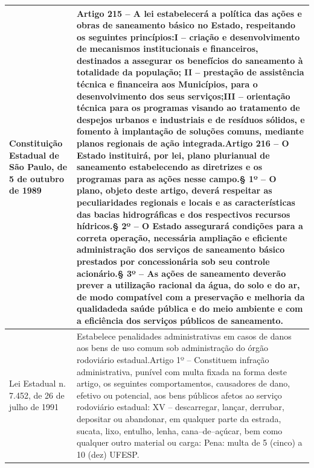 \begin{center}
\begin{longtable}{|p{}|p{}|}
			Constituição  Estadual  de  São Paulo,   de   5   de   outubro   de 1989 & Artigo  215  –  A  lei  estabelecerá  a  política  das  ações  e  obras  de  saneamento básico no Estado, respeitando os seguintes princípios:\newline{}I  –  criação  e  desenvolvimento  de  mecanismos  institucionais  e  financeiros, destinados a assegurar os benefícios do saneamento à totalidade da população; II  –  prestação  de  assistência  técnica  e  financeira  aos  Municípios,  para  o desenvolvimento dos seus serviços;\newline{}III – orientação técnica para os programas visando ao tratamento  de despejos urbanos  e  industriais  e  de  resíduos  sólidos,  e  fomento  à  implantação  de soluções comuns, mediante planos regionais de ação integrada.\newline{}Artigo  216  –  O  Estado  instituirá,  por  lei,  plano  plurianual  de  saneamento estabelecendo as diretrizes e os programas para as ações nesse campo.\newline{}§ 1º – O plano, objeto deste artigo, deverá respeitar as peculiaridades regionais e locais e as características das bacias hidrográficas e dos respectivos recursos hídricos.\newline{}§  2º  –  O  Estado  assegurará  condições  para  a  correta  operação,  necessária ampliação   e   eficiente   administração   dos   serviços   de   saneamento   básico prestados por concessionária sob seu controle acionário.\newline{}§ 3º – As ações de saneamento deverão prever a utilização racional da água, do solo e do ar, de modo compatível com a preservação e melhoria da qualidade\newline{}da saúde pública e do meio ambiente e com a eficiência dos serviços públicos de saneamento. \\
			\hline
			Lei Estadual n. 7.452, de 26 de julho de 1991 & Estabelece  penalidades  administrativas  em  casos  de  danos  aos  bens  de  uso comum sob administração do órgão rodoviário estadual.\newline{}Artigo  1º  –  Constituem  infração  administrativa,  punível  com  multa  fixada  na forma deste artigo, os seguintes comportamentos, causadores de dano, efetivo ou potencial, aos bens públicos afetos ao serviço rodoviário estadual:\newline{} XV – descarregar, lançar, derrubar, depositar ou abandonar, em qualquer parte da  estrada,  sucata,  lixo,  entulho,  lenha,  cana–de–açúcar, bem  como  qualquer outro material ou carga: Pena: multa de 5 (cinco) a 10 (dez) UFESP. \\

\end{longtable}
\end{center}
